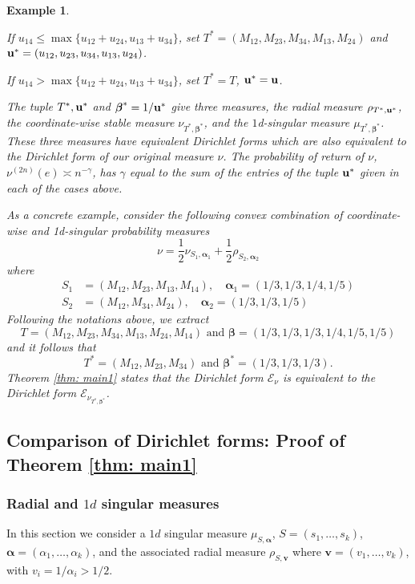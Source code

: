 \documentclass[pdflatex,sn-mathphys-num]{sn-jnl}%
\theoremstyle{thmstyleone}%
\theoremstyle{thmstyletwo}%
\newtheorem{exa}{Example}%
\theoremstyle{thmstylethree}%
\begin{document}
\begin{exa}
\begin{enumerate}
If $u_{14}\le \max\{u_{12}+u_{24},u_{13}+u_{34}\}$, set $T^*=(M_{12},M_{23},M_{34},M_{13},M_{24})$
and ${\bf u}^*=(u_{12},u_{23},u_{34},u_{13},u_{24})$.

If $u_{14}> \max\{u_{12}+u_{24},u_{13}+u_{34}\}$,
set $T^*=T$, ${\bf u}^*={\bf u}$.\end{enumerate}
The tuple $T^*,{\bf u}^* $ and $\boldsymbol{\beta}^*=1/{\bf u}^*$ give three measures, the radial measure $\rho_{T^*,{\bf u}^*}$, the coordinate-wise stable measure $\nu_{T^*,{\boldsymbol \beta}^*}$, and the $1$d-singular measure $\mu_{T^*,{\boldsymbol \beta}^*}$. These three measures have equivalent Dirichlet forms which are also equivalent to the Dirichlet form of our original measure $\nu$. The probability of return of $\nu$, $\nu^{(2n)}(e)\asymp n^{-\gamma}$, has $\gamma$ equal to the sum of the entries of the tuple ${\bf u^*}$ given in each of the cases above.  

As a concrete example, 
consider the following convex combination of coordinate-wise and 1d-singular probability measures
$$\nu = \frac{1}{2}\nu_{S_1,\bm{\alpha}_1} + \frac{1}{2}\rho_{S_2,\bm{\alpha}_2} $$
where 
\begin{align*}
    S_1 &= (M_{12}, M_{23}, M_{13}, M_{14}),\quad \bm{\alpha}_1 = (1/3, 1/3, 1/4, 1/5)\\
     S_2 &= (M_{12}, M_{34}, M_{24}),\quad \bm{\alpha}_2  = (1/3, 1/3, 1/5)
\end{align*}
Following the notations above, we extract
$$T = (M_{12}, M_{23}, M_{34}, M_{13}, M_{24}, M_{14}) \text { and }\bm{\beta} = (1/3, 1/3,1/3, 1/4, 1/5, 1/5) $$
and it follows that
$$T^* = (M_{12}, M_{23}, M_{34}) \text{ and }\bm{\beta}^* = (1/3, 1/3,1/3). $$
Theorem \ref{thm: main1} states that the Dirichlet form $\mathcal E_\nu$ is equivalent to the Dirichlet form $\mathcal E_{\nu_{T^*,\bm{\beta}^*}}$.
\end{exa}




\subsection{Comparison of Dirichlet forms: Proof of Theorem \ref{thm: main1}}
\subsubsection{Radial and $1d$ singular measures}
In this section we consider a $1d$ singular measure $\mu_{S,\bm{\alpha}}$, $S=(s_1,\dots, s_k)$, $\bm{\alpha}=(\alpha_1,\dots,\alpha_k)$, and
the associated radial measure $\rho_{S,\mathbf v}$ where $\mathbf v=(v_1,\dots,v_k)$, with $v_i=1/\alpha_i>1/2$.
\end{document}
